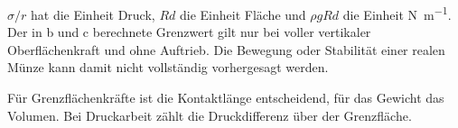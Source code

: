 \begin{kontrolle}
$\sigma/r$ hat die Einheit Druck, $Rd$ die Einheit Fläche und
$\rho gRd$ die Einheit \si{\newton\per\metre}. Der in b und c berechnete
Grenzwert gilt nur bei voller vertikaler Oberflächenkraft und ohne Auftrieb.
Die Bewegung oder Stabilität einer realen Münze kann damit nicht vollständig
vorhergesagt werden.
\end{kontrolle}

\begin{merksatz}
Für Grenzflächenkräfte ist die Kontaktlänge entscheidend, für das Gewicht das
Volumen. Bei Druckarbeit zählt die Druckdifferenz über der Grenzfläche.
\end{merksatz}

